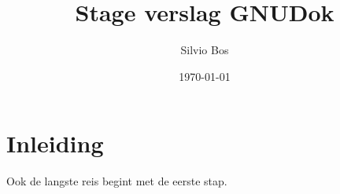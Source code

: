 \documentclass[12pt,a4paper]{article}
\begin{document}
\title{Stage verslag GNUDok}
\author{Silvio Bos}
\date{\today}
\maketitle
\section{Inleiding}
Ook de langste reis begint met de eerste stap.
\end{document}
